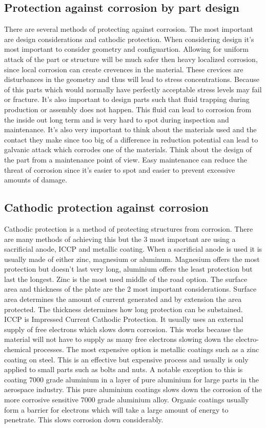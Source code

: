 \documentclass[11pt, a4paper]{article}
\begin{document}
\subsection{Protection against corrosion by part design}
There are several methods of protecting against corrosion. The most important are design considerations and cathodic protection.
When considering design it's most important to consider geometry and configuartion. Allowing for uniform attack of the part or structure will be much safer then heavy localized corrosion, since local corrosion can create crevences in the material. These crevices are disturbances in the geometry and thus will lead to stress concentrations. Because of this parts which would normally have perfectly acceptable stress levels may fail or fracture. It's also important to design parts such that fluid trapping during production or assembly does not happen. This fluid can lead to corrosion from the inside out long term and is very hard to spot during inspection and maintenance. It's also very important to think about the materials used and the contact they make since too big of a difference in reduction potential can lead to galvanic attack which corrodes one of the materials. Think about the design of the part from a maintenance point of view. Easy maintenance can reduce the threat of corrosion since it's easier to spot and easier to prevent excessive amounts of damage.


\subsection{Cathodic protection against corrosion}
Cathodic protection is a method of protecting structures from corrosion. There are many methods of achieving this but the 3 most important are using a sacrificial anode, ICCP and metallic coating.
When a sacrificial anode is used it is usually made of either zinc, magnesium or aluminum. Magnesium offers the most protection but doesn't last very long, aluminium offers the least protection but last the longest. Zinc is the most used middle of the road option. The surface area and thickness of the plate are the 2 most important considerations. Surface area determines the amount of current generated and by extension the area protected. The thickness determines how long protection can be substained.
ICCP is Impressed Current Cathodic Protection. It usually uses an external supply of free electrons which slows down corrosion. This works because the material will not have to supply as many free electrons slowing down the electro-chemical processes.
The most expensive option is metallic coatings such as a zinc coating on steel. This is an effective but expensive process and usually is only applied to small parts such as bolts and nuts. A notable exception to this is coating 7000 grade aluminium in a layer of pure aluminium for large parts in the aerospace industry. This pure aluminium coatings slows down the corrosion of the more corrosive sensitive 7000 grade aluminium alloy.
Organic coatings usually form a barrier for electrons which will take a large amount of energy to penetrate. This slows corrosion down considerably.
\end{document}
